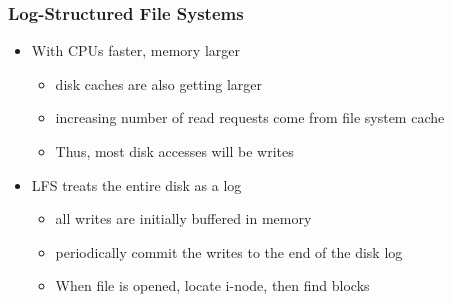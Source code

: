 \documentclass[12pt]{article}
\begin{document}
\subsubsection{Log-Structured File Systems}
\begin{itemize}
    \item With CPUs faster, memory larger \begin{itemize}
        \item disk caches are also getting larger 
        \item increasing number of read requests come from file system cache 
        \item Thus, most disk accesses will be writes
    \end{itemize}
    \item LFS treats the entire disk as a log \begin{itemize}
        \item all writes are initially buffered in memory 
        \item periodically commit the writes to the end of the disk log 
        \item When file is opened, locate i-node, then find blocks
    \end{itemize}
\end{itemize}
\end{document}
